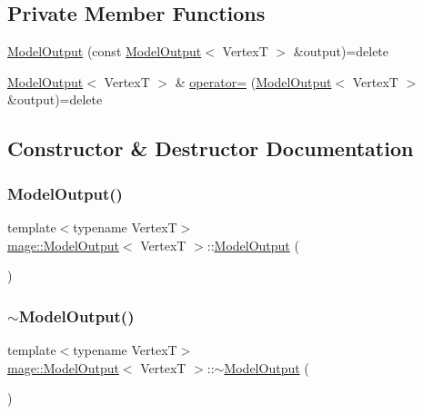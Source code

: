 \subsection*{Private Member Functions}
\begin{DoxyCompactItemize}
\item 
\hyperlink{structmage_1_1_model_output_aac808e40a66f33da4ea28ebb7443623d}{Model\+Output} (const \hyperlink{structmage_1_1_model_output}{Model\+Output}$<$ VertexT $>$ \&output)=delete
\item 
\hyperlink{structmage_1_1_model_output}{Model\+Output}$<$ VertexT $>$ \& \hyperlink{structmage_1_1_model_output_a22a473a6e34c6bcc81e645e692a1a1fc}{operator=} (\hyperlink{structmage_1_1_model_output}{Model\+Output}$<$ VertexT $>$ \&output)=delete
\end{DoxyCompactItemize}


\subsection{Constructor \& Destructor Documentation}
\hypertarget{structmage_1_1_model_output_a7d64b57d8207968541eb9c6da6ef0163}{}\label{structmage_1_1_model_output_a7d64b57d8207968541eb9c6da6ef0163} 
\subsubsection{\texorpdfstring{Model\+Output()}{ModelOutput()}\hspace{0.1cm}{\footnotesize\ttfamily [1/2]}}
{\footnotesize\ttfamily template$<$typename VertexT$>$ \\
\hyperlink{structmage_1_1_model_output}{mage\+::\+Model\+Output}$<$ VertexT $>$\+::\hyperlink{structmage_1_1_model_output}{Model\+Output} (\begin{DoxyParamCaption}{ }\end{DoxyParamCaption})\hspace{0.3cm}{\ttfamily [default]}}

\hypertarget{structmage_1_1_model_output_a69a7f27486ad287943cbf973107ad8e1}{}\label{structmage_1_1_model_output_a69a7f27486ad287943cbf973107ad8e1} 
\subsubsection{\texorpdfstring{$\sim$\+Model\+Output()}{~ModelOutput()}}
{\footnotesize\ttfamily template$<$typename VertexT$>$ \\
\hyperlink{structmage_1_1_model_output}{mage\+::\+Model\+Output}$<$ VertexT $>$\+::$\sim$\hyperlink{structmage_1_1_model_output}{Model\+Output} (\begin{DoxyParamCaption}{ }\end{DoxyParamCaption})\hspace{0.3cm}{\ttfamily [default]}}

